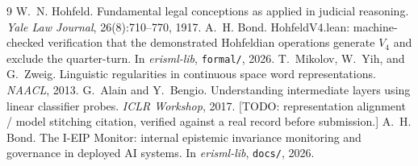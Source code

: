 \documentclass[11pt]{article}
\begin{document}
\begin{thebibliography}{9}
 W.~N. Hohfeld. Fundamental legal conceptions as applied in judicial
reasoning. \emph{Yale Law Journal}, 26(8):710--770, 1917.
 A.~H. Bond. HohfeldV4.lean: machine-checked verification that the
demonstrated Hohfeldian operations generate $V_4$ and exclude the quarter-turn. In
\emph{erisml-lib}, \texttt{formal/}, 2026. %
 T.~Mikolov, W.~Yih, and G.~Zweig. Linguistic regularities in
continuous space word representations. \emph{NAACL}, 2013. %
 G.~Alain and Y.~Bengio. Understanding intermediate layers using linear
classifier probes. \emph{ICLR Workshop}, 2017. %
 [TODO: representation alignment / model stitching citation,
verified against a real record before submission.]
 A.~H. Bond. The I-EIP Monitor: internal epistemic invariance
monitoring and governance in deployed AI systems. In \emph{erisml-lib}, \texttt{docs/},
2026. %
\end{thebibliography}
\end{document}
